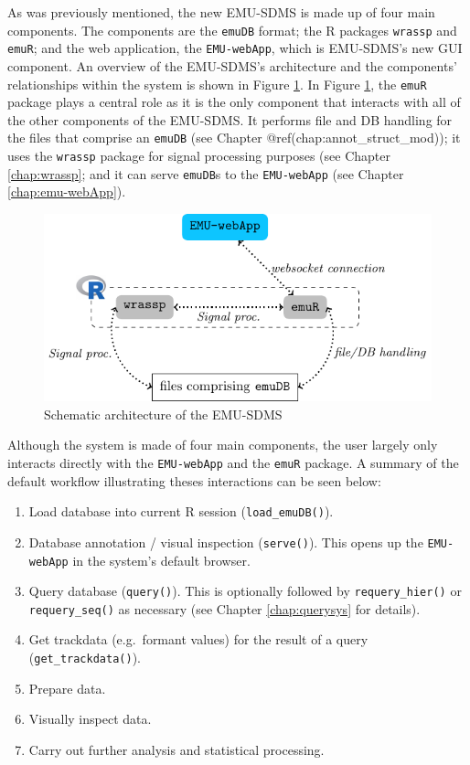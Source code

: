 \documentclass[]{book}
\providecommand{\tightlist}{%
  \setlength{\itemsep}{0pt}\setlength{\parskip}{0pt}}
\begin{document}
As was previously mentioned, the new EMU-SDMS is made up of four main components. The components are the \texttt{emuDB} format; the R packages \texttt{wrassp} and \texttt{emuR}; and the web application, the \texttt{EMU-webApp}, which is EMU-SDMS's new GUI component. An overview of the EMU-SDMS's architecture and the components' relationships within the system is shown in Figure \ref{fig:overview-archOver}. In Figure \ref{fig:overview-archOver}, the \texttt{emuR} package plays a central role as it is the only component that interacts with all of the other components of the EMU-SDMS. It performs file and DB handling for the files that comprise an \texttt{emuDB} (see Chapter @ref(chap:annot\_struct\_mod)); it uses the \texttt{wrassp} package for signal processing purposes (see Chapter \ref{chap:wrassp}; and it can serve \texttt{emuDB}s to the \texttt{EMU-webApp} (see Chapter \ref{chap:emu-webApp}).

\begin{figure}

{\centering \includegraphics[width=0.75\linewidth]{pics/overview} 

}

\caption{Schematic architecture of the EMU-SDMS}\label{fig:overview-archOver}
\end{figure}

Although the system is made of four main components, the user largely only interacts directly with the \texttt{EMU-webApp} and the \texttt{emuR} package. A summary of the default workflow illustrating theses interactions can be seen below:

\begin{enumerate}
\def\labelenumi{\arabic{enumi}.}
\tightlist
\item
  Load database into current R session (\texttt{load\_emuDB()}).
\item
  Database annotation / visual inspection (\texttt{serve()}). This opens up the \texttt{EMU-webApp} in the system's default browser.
\item
  Query database (\texttt{query()}). This is optionally followed by \texttt{requery\_hier()} or \texttt{requery\_seq()} as necessary (see Chapter \ref{chap:querysys} for details).
\item
  Get trackdata (e.g.~formant values) for the result of a query (\texttt{get\_trackdata()}).
\item
  Prepare data.
\item
  Visually inspect data.
\item
  Carry out further analysis and statistical processing.
\end{enumerate}
\end{document}
